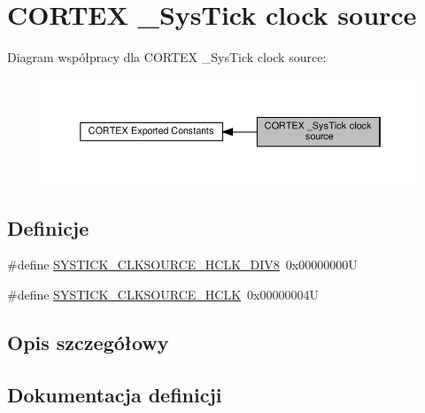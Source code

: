 \hypertarget{group___c_o_r_t_e_x___sys_tick__clock__source}{}\section{C\+O\+R\+T\+EX \+\_\+\+Sys\+Tick clock source}
\label{group___c_o_r_t_e_x___sys_tick__clock__source}
Diagram współpracy dla C\+O\+R\+T\+EX \+\_\+\+Sys\+Tick clock source\+:\nopagebreak
\begin{figure}[H]
\begin{center}
\leavevmode
\includegraphics[width=350pt]{group___c_o_r_t_e_x___sys_tick__clock__source}
\end{center}
\end{figure}
\subsection*{Definicje}
\begin{DoxyCompactItemize}
\item 
\#define \hyperlink{group___c_o_r_t_e_x___sys_tick__clock__source_ga1fd9b5bada2a8b2425a8523bc0fc7124}{S\+Y\+S\+T\+I\+C\+K\+\_\+\+C\+L\+K\+S\+O\+U\+R\+C\+E\+\_\+\+H\+C\+L\+K\+\_\+\+D\+I\+V8}~0x00000000U
\item 
\#define \hyperlink{group___c_o_r_t_e_x___sys_tick__clock__source_ga6f6582df23b6fbc578325e453b9893b7}{S\+Y\+S\+T\+I\+C\+K\+\_\+\+C\+L\+K\+S\+O\+U\+R\+C\+E\+\_\+\+H\+C\+LK}~0x00000004U
\end{DoxyCompactItemize}


\subsection{Opis szczegółowy}


\subsection{Dokumentacja definicji}
\mbox{\label{group___c_o_r_t_e_x___sys_tick__clock__source_ga6f6582df23b6fbc578325e453b9893b7}} 
